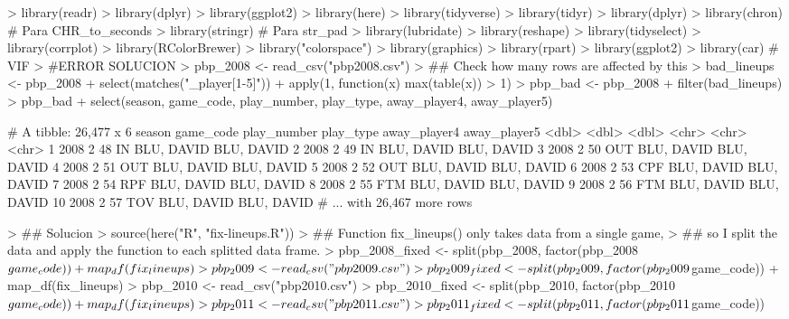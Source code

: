 \documentclass[paper=a4, fontsize=9pt]{article}
\begin{document}
\begin{Schunk}
\begin{Sinput}
> library(readr)
> library(dplyr)
> library(ggplot2)
> library(here)
> library(tidyverse)
> library(tidyr)
> library(dplyr)
> library(chron)                 # Para CHR_to_seconds
> library(stringr)               # Para str_pad
> library(lubridate)
> library(reshape)
> library(tidyselect)
> library(corrplot)
> library(RColorBrewer)
> library("colorspace")
> library(graphics)
> library(rpart)
> library(ggplot2)
> library(car)                   # VIF
> #ERROR SOLUCION
> pbp_2008 <- read_csv("pbp2008.csv")
> ## Check how many rows are affected by this
> bad_lineups <- pbp_2008 %
+   select(matches("_player[1-5]")) %
+   apply(1, function(x) max(table(x)) > 1)
> pbp_bad <- pbp_2008 %
+   filter(bad_lineups)
> pbp_bad %
+   select(season, game_code, play_number, play_type, away_player4, away_player5)
\end{Sinput}
\begin{Soutput}
# A tibble: 26,477 x 6
   season game_code play_number play_type away_player4 away_player5
    <dbl>     <dbl>       <dbl> <chr>     <chr>        <chr>       
 1   2008         2          48 IN        BLU, DAVID   BLU, DAVID  
 2   2008         2          49 IN        BLU, DAVID   BLU, DAVID  
 3   2008         2          50 OUT       BLU, DAVID   BLU, DAVID  
 4   2008         2          51 OUT       BLU, DAVID   BLU, DAVID  
 5   2008         2          52 OUT       BLU, DAVID   BLU, DAVID  
 6   2008         2          53 CPF       BLU, DAVID   BLU, DAVID  
 7   2008         2          54 RPF       BLU, DAVID   BLU, DAVID  
 8   2008         2          55 FTM       BLU, DAVID   BLU, DAVID  
 9   2008         2          56 FTM       BLU, DAVID   BLU, DAVID  
10   2008         2          57 TOV       BLU, DAVID   BLU, DAVID  
# ... with 26,467 more rows
\end{Soutput}
\begin{Sinput}
> ## Solucion
> source(here("R", "fix-lineups.R"))
> ## Function fix_lineups() only takes data from a single game,
> ## so I split the data and apply the function to each splitted data frame.
> pbp_2008_fixed <- split(pbp_2008, factor(pbp_2008$game_code)) %
+   map_df(fix_lineups) 
> pbp_2009 <- read_csv("pbp2009.csv")
> pbp_2009_fixed <- split(pbp_2009, factor(pbp_2009$game_code)) %
+   map_df(fix_lineups) 
> pbp_2010 <- read_csv("pbp2010.csv")
> pbp_2010_fixed <- split(pbp_2010, factor(pbp_2010$game_code)) %
+   map_df(fix_lineups) 
> pbp_2011 <- read_csv("pbp2011.csv")
> pbp_2011_fixed <- split(pbp_2011, factor(pbp_2011$game_code)) %

\end{Sinput}
\end{Schunk}
\end{document}
